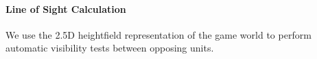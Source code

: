 \documentclass[10pt,twocolumn,letterpaper]{article}
\begin{document}
%

%



\vspace{-0.15in}
\paragraph{Line of Sight Calculation }

%
We use the 2.5D heightfield representation of the game world
to perform automatic visibility tests between opposing units.
\end{document}
